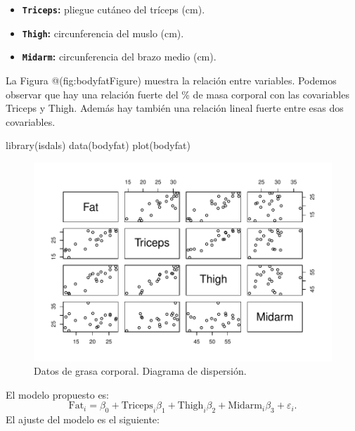 \documentclass[
]{article}
\newenvironment{Shaded}{\begin{snugshade}}{\end{snugshade}}
\newcommand{\FunctionTok}[1]{\textcolor[rgb]{0.00,0.00,0.00}{#1}}
\newcommand{\NormalTok}[1]{#1}
\providecommand{\tightlist}{%
  \setlength{\itemsep}{0pt}\setlength{\parskip}{0pt}}
\begin{document}
\begin{itemize}
\tightlist
\item
  \textbf{\texttt{Triceps}:} pliegue cutáneo del tríceps (cm).
\item
  \textbf{\texttt{Thigh}:} circunferencia del muslo (cm).
\item
  \textbf{\texttt{Midarm}:} circunferencia del brazo medio (cm).
\end{itemize}

La Figura @(fig:bodyfatFigure) muestra la relación entre variables. Podemos observar que hay una relación fuerte del \% de masa corporal con las covariables Triceps y Thigh. Además hay también una relación lineal fuerte entre esas dos covariables.

\begin{Shaded}
\begin{Highlighting}[]
\FunctionTok{library}\NormalTok{(isdals)}
\FunctionTok{data}\NormalTok{(bodyfat)}
\FunctionTok{plot}\NormalTok{(bodyfat)}
\end{Highlighting}
\end{Shaded}

\begin{figure}

{\centering \includegraphics{MLG2_files/figure-latex/bodyfatFigure-1} 

}

\caption{Datos de grasa corporal. Diagrama de dispersión.}\label{fig:bodyfatFigure}
\end{figure}

El modelo propuesto es:
\[
\mbox{Fat}_{i} = \beta_{0} + \mbox{Triceps}_{i}\beta_{1} + \mbox{Thigh}_{i}\beta_{2} + \mbox{Midarm}_{i}\beta_{3} + \varepsilon_{i}.
\]
El ajuste del modelo es el siguiente:
\end{document}
